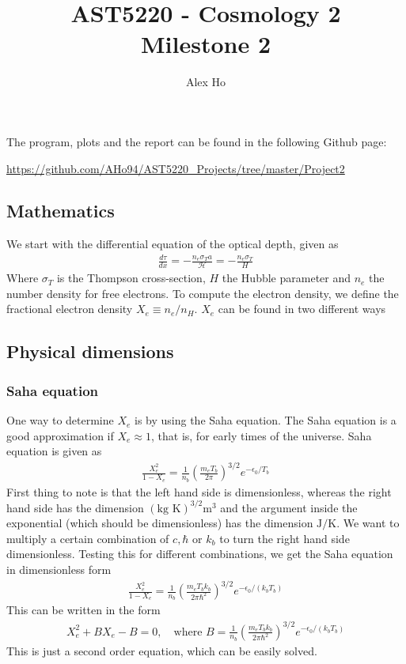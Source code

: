 \documentclass[12pt]{article}
\author{Alex Ho}
\title{AST5220 - Cosmology 2 \\ Milestone 2}
\begin{document}
\maketitle
The program, plots and the report can be found in the following Github page:

\url{https://github.com/AHo94/AST5220_Projects/tree/master/Project2}
\subsection*{Mathematics}
We start with the differential equation of the optical depth, given as
\begin{align}
\frac{d\tau}{dx} = -\frac{n_e \sigma_T a}{\mathcal{H}} = -\frac{n_e \sigma_T}{H}
\end{align}
Where $\sigma_T$ is the Thompson cross-section, $H$ the Hubble parameter and $n_e$ the number density for free electrons. To compute the electron density, we define the fractional electron density $X_e \equiv n_e/n_H$. $X_e$ can be found in two different ways
\subsection*{Physical dimensions}
\subsubsection*{Saha equation}
One way to determine $X_e$ is by using the Saha equation. The Saha equation is a good approximation if $X_e \approx 1$, that is, for early times of the universe. Saha equation is given as
\begin{align}
\frac{X_e^2}{1-X_e} = \frac{1}{n_b}\left( \frac{m_e T_b}{2\pi}\right)^{3/2}e^{-\epsilon_0/T_b}
\end{align}
First thing to note is that the left hand side is dimensionless, whereas the right hand side has the dimension $(\text{kg K})^{3/2}\text{m}^3$ and the argument inside the exponential (which should be dimensionless) has the dimension $\text{J}/\text{K}$. We want to multiply a certain combination of $c, \hbar$ or $k_b$ to turn the right hand side dimensionless. Testing this for different combinations, we get the Saha equation in dimensionless form
\begin{align}
\frac{X_e^2}{1-X_e} =\frac{1}{n_b}\left( \frac{m_e T_b k_b}{2\pi \hbar^2}\right)^{3/2}e^{-\epsilon_0/(k_b T_b)}
\end{align}
This can be written in the form
\begin{align}
X_e^2 + BX_e - B = 0, \quad \text{where } B = \frac{1}{n_b}\left( \frac{m_e T_b k_b}{2\pi \hbar^2}\right)^{3/2}e^{-\epsilon_0/(k_b T_b)}
\end{align}
This is just a second order equation, which can be easily solved.
\end{document}
